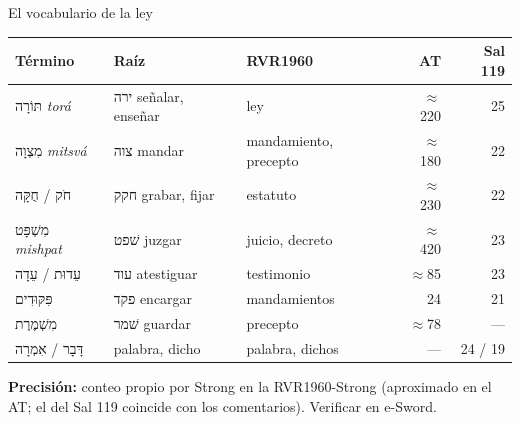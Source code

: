\documentclass[hyperref={bookmarks=false},aspectratio=169]{beamer}
\newcommand{\heb}[1]{\mbox{\foreignlanguage{hebrew}{#1}}}
\newcommand{\precision}[1]{{\footnotesize\color{gris}\textbf{Precisión:} #1}}
\begin{document}
\begin{frame}{El vocabulario de la ley}
\scriptsize\renewcommand{\arraystretch}{1.12}
\begin{tabular}{@{}>{\RaggedRight\arraybackslash}p{2.5cm}>{\RaggedRight\arraybackslash}p{3.9cm}>{\RaggedRight\arraybackslash}p{2.8cm}r r@{}}
\toprule
\textbf{Término} & \textbf{Raíz} & \textbf{RVR1960} & \textbf{AT} & \textbf{Sal 119} \\ \midrule
\heb{תּוֹרָה} \emph{torá} & \heb{ירה} señalar, enseñar & ley & $\approx$220 & 25 \\
\heb{מִצְוָה} \emph{mitsvá} & \heb{צוה} mandar & mandamiento, precepto & $\approx$180 & 22 \\
\heb{חֹק} / \heb{חֻקָּה} & \heb{חקק} grabar, fijar & estatuto & $\approx$230 & 22 \\
\heb{מִשְׁפָּט} \emph{mishpat} & \heb{שׁפט} juzgar & juicio, decreto & $\approx$420 & 23 \\
\heb{עֵדוּת} / \heb{עֵדָה} & \heb{עוד} atestiguar & testimonio & $\approx$85 & 23 \\
\heb{פִּקּוּדִים} & \heb{פקד} encargar & mandamientos & 24 & 21 \\
\heb{מִשְׁמֶרֶת} & \heb{שׁמר} guardar & precepto & $\approx$78 & --- \\
\heb{דָּבָר} / \heb{אִמְרָה} & palabra, dicho & palabra, dichos & --- & 24 / 19 \\
\bottomrule
\end{tabular}\par\medskip
\precision{conteo propio por Strong en la RVR1960-Strong (aproximado en el AT; el del Sal 119 coincide con los comentarios). Verificar en e-Sword.}
\end{frame}
\end{document}
